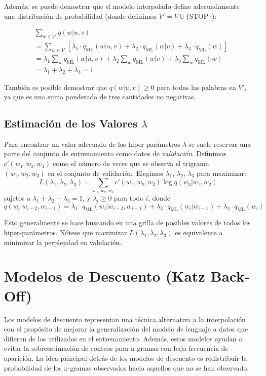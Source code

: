\documentclass[11pt,fleqn]{book} %
\begin{document}
Además, se puede demostrar que el modelo interpolado define adecuadamente una distribución de probabilidad (donde definimos $V' = V \cup \{\text{STOP}\}$):

\[
\begin{aligned}
    & \sum_{w \in V'} q(w | u, v) \\
    &= \sum_{w \in V'} [\lambda_1 \cdot q_{\text{ML}}(w | u, v) + \lambda_2 \cdot q_{\text{ML}}(w | v) + \lambda_3 \cdot q_{\text{ML}}(w)] \\
    &= \lambda_1 \sum_{w} q_{\text{ML}}(w | u, v) + \lambda_2 \sum_{w} q_{\text{ML}}(w | v) + \lambda_3 \sum_{w} q_{\text{ML}}(w) \\
    &= \lambda_1 + \lambda_2 + \lambda_3 = 1
\end{aligned}
\]

También es posible demostrar que $q(w | u, v) \geq 0$ para todas las palabras en $V'$, ya que es una suma ponderada de tres cantidades no negativas.



\subsection{Estimación de los Valores $\lambda$}
Para encontrar un valor adecuado de los hiper-parámetros $\lambda$ se suele reservar una parte del conjunto de entrenamiento como datos de \textit{validación}. Definimos $c'(w_1, w_2, w_3)$ como el número de veces que se observa el trigrama $(w_1, w_2, w_3)$ en el conjunto de validación. Elegimos $\lambda_1$, $\lambda_2$, $\lambda_3$ para maximizar:
    \[
    L(\lambda_1, \lambda_2, \lambda_3) = \sum_{w_1,w_2,w_3} c'(w_1, w_2, w_3) \log q(w_3 | w_1, w_2)
    \]
    sujetos a $\lambda_1 + \lambda_2 + \lambda_3 = 1$, y $\lambda_i \geq 0$ para todo $i$, donde
    \[
    q(w_i | w_{i-2}, w_{i-1}) = \lambda_1 \cdot q_{\text{ML}}(w_i | w_{i-2}, w_{i-1}) + \lambda_2 \cdot q_{\text{ML}}(w_i | w_{i-1}) + \lambda_3 \cdot q_{\text{ML}}(w_i)
    \]
    
Esto generalmente se hace buscando en una grilla de posibles valores de todos los hiper-parámetros. Nótese que maximizar $L(\lambda_1, \lambda_2, \lambda_3)$ es equivalente a minimizar la perplejidad en validación.  


\section{Modelos de Descuento (Katz Back-Off)}

Los modelos de descuento representan una técnica alternativa a la interpolación con el propósito de mejorar la generalización del modelo de lenguaje a datos que difieren de los utilizados en el entrenamiento. Además, estos modelos ayudan a evitar la sobreestimación de conteos para n-gramas con baja frecuencia de aparición. La idea principal detrás de los modelos de descuento es redistribuir la probabilidad de los n-gramas observados hacia aquellos que no se han observado.
\end{document}
